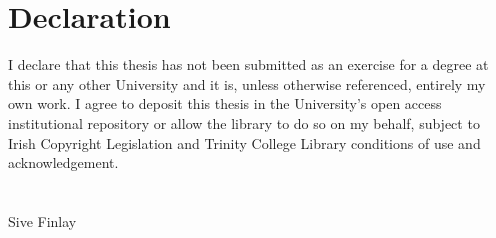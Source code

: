 

\chapter*{Declaration}

I declare that this thesis has not been submitted as an exercise for a degree at this or any other University and it is, unless otherwise referenced, entirely my own work. I agree to deposit this thesis in the University's open access institutional repository or allow the library to do so on my behalf, subject to Irish Copyright Legislation and Trinity College Library conditions of use and acknowledgement.
\\
\\
\\

Sive Finlay